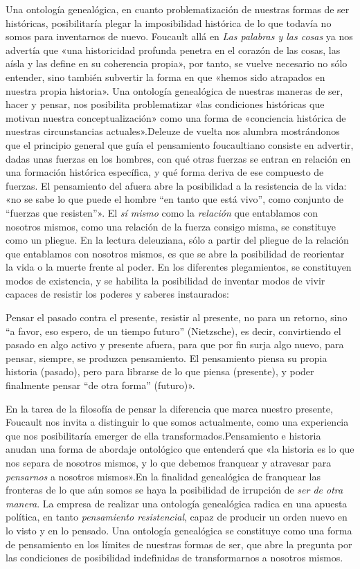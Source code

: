 Una ontología genealógica, en cuanto problematización de nuestras formas de ser históricas, posibilitaría plegar la imposibilidad histórica de lo que todavía no somos para inventarnos de nuevo. Foucault allá en \emph{Las palabras y las cosas} ya nos advertía que «una historicidad profunda penetra en el corazón de las cosas, las aísla y las define en su coherencia propia», por tanto, se vuelve necesario no sólo entender, sino también subvertir la forma en que «hemos sido atrapados en nuestra propia historia». Una ontología genealógica de nuestras maneras de ser, hacer y pensar, nos posibilita problematizar «las condiciones históricas que motivan nuestra conceptualización» como una forma de «conciencia histórica de nuestras circunstancias actuales».Deleuze de vuelta nos alumbra mostrándonos que el principio general que guía el pensamiento foucaultiano consiste en advertir, dadas unas fuerzas en los hombres, con qué otras fuerzas se entran en relación en una formación histórica específica, y qué forma deriva de ese compuesto de fuerzas. El pensamiento del afuera abre la posibilidad a la resistencia de la vida: «no se sabe lo que puede el hombre ``en tanto que está vivo'', como conjunto de ``fuerzas que resisten''». El \emph{sí mismo} como la \emph{relación} que entablamos con nosotros mismos, como una relación de la fuerza consigo misma, se constituye como un pliegue. En la lectura deleuziana, sólo a partir del pliegue de la relación que entablamos con nosotros mismos, es que se abre la posibilidad de reorientar la vida o la muerte frente al poder. En los diferentes plegamientos, se constituyen modos de existencia, y se habilita la posibilidad de inventar modos de vivir capaces de resistir los poderes y saberes instaurados:

Pensar el pasado contra el presente, resistir al presente, no para un retorno, sino ``a favor, eso espero, de un tiempo futuro'' (Nietzsche), es decir, convirtiendo el pasado en algo activo y presente afuera, para que por fin surja algo nuevo, para pensar, siempre, se produzca pensamiento. El pensamiento piensa su propia historia (pasado), pero para librarse de lo que piensa (presente), y poder finalmente pensar ``de otra forma'' (futuro)».

En la tarea de la filosofía de pensar la diferencia que marca nuestro presente, Foucault nos invita a distinguir lo que somos actualmente, como una experiencia que nos posibilitaría emerger de ella transformados.Pensamiento e historia anudan una forma de abordaje ontológico que entenderá que «la historia es lo que nos separa de nosotros mismos, y lo que debemos franquear y atravesar para \emph{pensarnos} a nosotros mismos».En la finalidad genealógica de franquear las fronteras de lo que aún somos se haya la posibilidad de irrupción de \emph{ser de otra manera}. La empresa de realizar una ontología genealógica radica en una apuesta política, en tanto \emph{pensamiento resistencial}, capaz de producir un orden nuevo en lo visto y en lo pensado. Una ontología genealógica se constituye como una forma de pensamiento en los límites de nuestras formas de ser, que abre la pregunta por las condiciones de posibilidad indefinidas de transformarnos a nosotros mismos.

